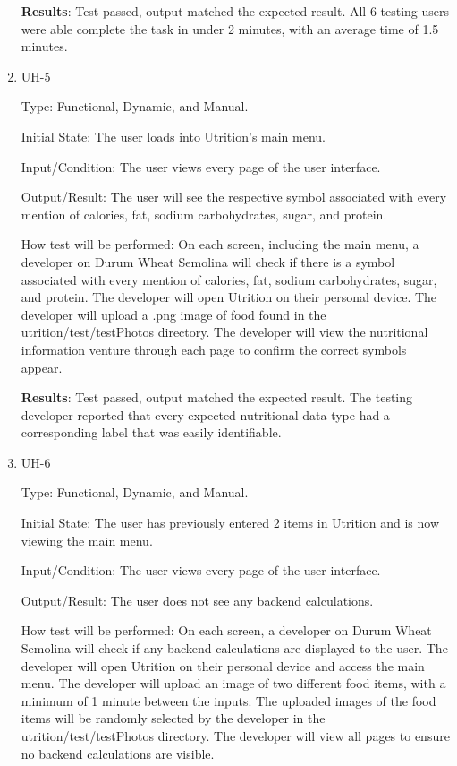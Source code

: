 \documentclass[12pt, titlepage]{article}
\begin{document}
\begin{enumerate}
		\textbf{Results}: Test passed, output matched the expected result. All 6 testing users were able complete the task in under 2 minutes, with an average time of 1.5 minutes.
		
		\item{UH-5}
		
		Type: Functional, Dynamic, and Manual.
		
		Initial State: The user loads into Utrition’s main menu.
		
		Input/Condition: The user views every page of the user interface.
		
		Output/Result: The user will see the respective symbol associated with every mention of calories, fat, sodium carbohydrates, sugar, and protein.
		
		How test will be performed: On each screen, including the main menu, a developer on Durum Wheat Semolina will check if there is a symbol associated with every mention of calories, fat, sodium carbohydrates, sugar, and protein. The developer will open Utrition on their personal device. The developer will upload a .png image of food found in the utrition/test/testPhotos directory. The developer will view the nutritional information venture through each page to confirm the correct symbols appear.
		
		\textbf{Results}: Test passed, output matched the expected result. The testing developer reported that every expected nutritional data type had a corresponding label that was easily identifiable.
		
		\item{UH-6}
		
		Type: Functional, Dynamic, and Manual.
		
		Initial State: The user has previously entered 2 items in Utrition and is now viewing the main menu.
		
		Input/Condition: The user views every page of the user interface.
		
		Output/Result: The user does not see any backend calculations.
		
		How test will be performed: On each screen, a developer on Durum Wheat Semolina will check if any backend calculations are displayed to the user. The developer will open Utrition on their personal device and access the main menu. The developer will upload an image of two different food items, with a minimum of 1 minute between the inputs. The uploaded images of the food items will be randomly selected by the developer in the utrition/test/testPhotos directory. The developer will view all pages to ensure no backend calculations are visible.
		

\end{enumerate}
\end{document}
